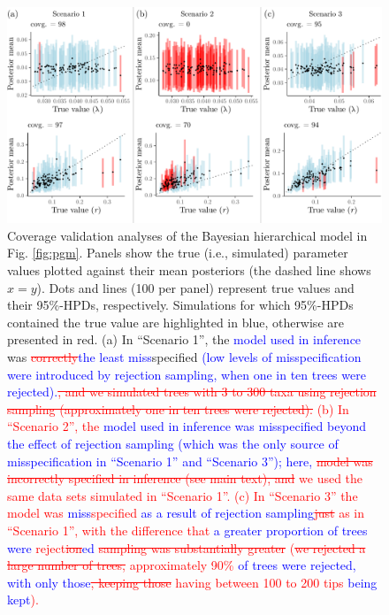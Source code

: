 \documentclass[oneside]{article}
\begin{document}
\begin{figure}
  \includegraphics[width=\textwidth]{../figures/graphical_model_coverage.pdf}
  \caption{
    Coverage validation analyses of the Bayesian hierarchical model in Fig. \ref{fig:pgm}.
    Panels show the true (i.e., simulated) parameter values plotted against their mean posteriors (the dashed line shows $x = y$).
    Dots and lines (100 per panel) represent true values and their 95\%-HPDs, respectively.
    Simulations for which 95\%-HPDs contained the true value are highlighted in blue, otherwise are presented in red.
    (a) In ``Scenario 1'', the \textcolor{blue}{model used in inference} was \textcolor{red}{\st{correctly}}\textcolor{blue}{the least miss}specified \textcolor{blue}{(low levels of misspecification were introduced by rejection sampling, when one in ten trees were rejected).}\textcolor{red}{\st{, and we simulated trees with 3 to 300 taxa using rejection sampling (approximately one in ten trees were rejected).} 
    (b) In ``Scenario 2'', the \textcolor{blue}{model used in inference was misspecified beyond the effect of rejection sampling (which was the only source of misspecification in ``Scenario 1'' and ``Scenario 3''); here, }\textcolor{red}{\st{model was incorrectly specified in inference (see main text), and}} we used the same data sets simulated in ``Scenario 1''.
    (c) In ``Scenario 3'' the model was \textcolor{blue}{miss}specified \textcolor{blue}{as a result of rejection sampling}\textcolor{red}{\st{just}} as in ``Scenario 1'', with the difference that \textcolor{blue}{a greater proportion of trees were} reject\textcolor{red}{\st{ion}}\textcolor{blue}{ed}\textcolor{red}{\st{ sampling was substantially greater}} (\textcolor{red}{\st{we rejected a large number of trees, }}approximately 90\% \textcolor{blue}{of trees were rejected, with only those}\textcolor{red}{\st{, keeping those }}having between 100 to 200 tips \textcolor{blue}{being kept}).
  }}
  \label{fig:yulecalval}
\end{figure}
\end{document}
